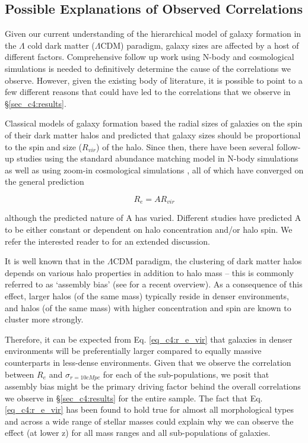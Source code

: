 \subsection{Possible Explanations of Observed Correlations} \label{sec_c4:theory}
Given our current understanding of the hierarchical model of galaxy formation in the $\Lambda$ cold dark matter ($\Lambda$CDM) paradigm, galaxy sizes are affected by a host of different factors. Comprehensive follow up work using N-body and cosmological simulations is needed to definitively determine the cause of the correlations we observe. However, given the existing body of literature, it is possible to point to a few different reasons that could have led to the correlations that we observe in \S \ref{sec_c4:results}.

Classical models of galaxy formation \citep[e.g.,][]{fall80,mo98} based the radial sizes of galaxies on the spin of their dark matter halos and predicted that galaxy sizes should be proportional to the spin and size ($R_{vir}$) of the halo. Since then, there have been several follow-up studies using the standard abundance matching model in N-body simulations as well as using zoom-in cosmological simulations \citep[e.g.,][]{Kravtsov13, somerville18, jiang19}, all of which have converged on the general prediction

\begin{equation}
    R_e = A R_{vir}
    \label{eq_c4:r_e_vir}
\end{equation}

\noindent although the predicted nature of A has varied. Different studies have predicted A to be either constant or dependent on halo concentration and/or halo spin. We refer the interested reader to \citet{wechsler_tinker} for an extended discussion.

It is well known that in the $\Lambda$CDM paradigm, the clustering of dark matter halos depends on various halo properties in addition to halo mass \citep[e.g.,][]{wechsler02,wechsler06,gao07} -- this is commonly referred to as `assembly bias' (see \citet{mao18} for a recent overview). As a consequence of this effect, larger halos (of the same mass) typically reside in denser environments, and  halos (of the same mass) with higher concentration and spin are known to cluster more strongly. 

Therefore, it can be expected from Eq. \ref{eq_c4:r_e_vir} that galaxies in denser environments will be preferentially larger compared to equally massive counterparts in less-dense environments. Given that we observe the correlation between $R_e$ and $\sigma_{r=10cMpc}$ for each of the sub-populations, we posit that assembly bias might be the primary driving factor behind the overall correlations we observe in \S \ref{sec_c4:results} for the entire sample. The fact that Eq. \ref{eq_c4:r_e_vir} has been found to hold true for almost all morphological types and across a wide range of stellar masses \cite[e.g.,][]{Kravtsov13} could explain why we can observe the effect (at lower z) for all mass ranges and all sub-populations of galaxies. 

